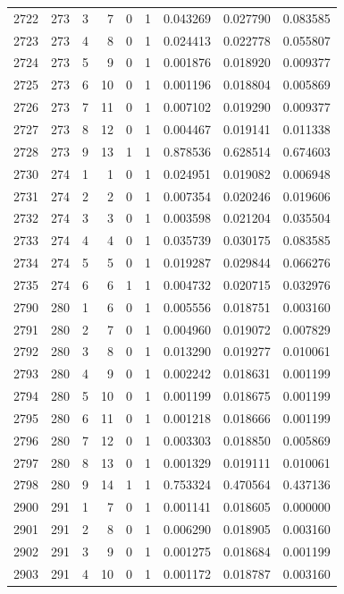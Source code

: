 \begin{longtable}{rrrrrrrrr}
2722 & 273 & 3 & 7 & 0 & 1 & 0.043269 & 0.027790 & 0.083585 \\
2723 & 273 & 4 & 8 & 0 & 1 & 0.024413 & 0.022778 & 0.055807 \\
2724 & 273 & 5 & 9 & 0 & 1 & 0.001876 & 0.018920 & 0.009377 \\
2725 & 273 & 6 & 10 & 0 & 1 & 0.001196 & 0.018804 & 0.005869 \\
2726 & 273 & 7 & 11 & 0 & 1 & 0.007102 & 0.019290 & 0.009377 \\
2727 & 273 & 8 & 12 & 0 & 1 & 0.004467 & 0.019141 & 0.011338 \\
2728 & 273 & 9 & 13 & 1 & 1 & 0.878536 & 0.628514 & 0.674603 \\
2730 & 274 & 1 & 1 & 0 & 1 & 0.024951 & 0.019082 & 0.006948 \\
2731 & 274 & 2 & 2 & 0 & 1 & 0.007354 & 0.020246 & 0.019606 \\
2732 & 274 & 3 & 3 & 0 & 1 & 0.003598 & 0.021204 & 0.035504 \\
2733 & 274 & 4 & 4 & 0 & 1 & 0.035739 & 0.030175 & 0.083585 \\
2734 & 274 & 5 & 5 & 0 & 1 & 0.019287 & 0.029844 & 0.066276 \\
2735 & 274 & 6 & 6 & 1 & 1 & 0.004732 & 0.020715 & 0.032976 \\
2790 & 280 & 1 & 6 & 0 & 1 & 0.005556 & 0.018751 & 0.003160 \\
2791 & 280 & 2 & 7 & 0 & 1 & 0.004960 & 0.019072 & 0.007829 \\
2792 & 280 & 3 & 8 & 0 & 1 & 0.013290 & 0.019277 & 0.010061 \\
2793 & 280 & 4 & 9 & 0 & 1 & 0.002242 & 0.018631 & 0.001199 \\
2794 & 280 & 5 & 10 & 0 & 1 & 0.001199 & 0.018675 & 0.001199 \\
2795 & 280 & 6 & 11 & 0 & 1 & 0.001218 & 0.018666 & 0.001199 \\
2796 & 280 & 7 & 12 & 0 & 1 & 0.003303 & 0.018850 & 0.005869 \\
2797 & 280 & 8 & 13 & 0 & 1 & 0.001329 & 0.019111 & 0.010061 \\
2798 & 280 & 9 & 14 & 1 & 1 & 0.753324 & 0.470564 & 0.437136 \\
2900 & 291 & 1 & 7 & 0 & 1 & 0.001141 & 0.018605 & 0.000000 \\
2901 & 291 & 2 & 8 & 0 & 1 & 0.006290 & 0.018905 & 0.003160 \\
2902 & 291 & 3 & 9 & 0 & 1 & 0.001275 & 0.018684 & 0.001199 \\
2903 & 291 & 4 & 10 & 0 & 1 & 0.001172 & 0.018787 & 0.003160 \\

\end{longtable}
